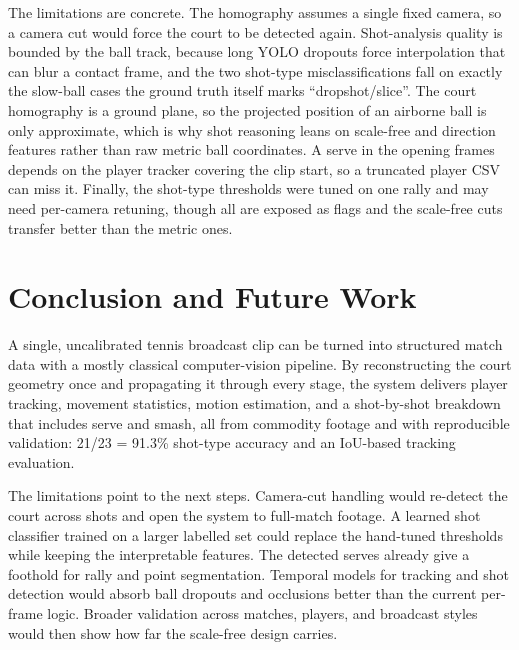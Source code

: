 \documentclass[11pt]{article}
\begin{document}
The limitations are concrete. The homography assumes a single fixed camera, so a camera cut would force the court to be detected again. Shot-analysis quality is bounded by the ball track, because long YOLO dropouts force interpolation that can blur a contact frame, and the two shot-type misclassifications fall on exactly the slow-ball cases the ground truth itself marks ``dropshot/slice''. The court homography is a ground plane, so the projected position of an airborne ball is only approximate, which is why shot reasoning leans on scale-free and direction features rather than raw metric ball coordinates. A serve in the opening frames depends on the player tracker covering the clip start, so a truncated player CSV can miss it. Finally, the shot-type thresholds were tuned on one rally and may need per-camera retuning, though all are exposed as flags and the scale-free cuts transfer better than the metric ones.

\section{Conclusion and Future Work}
A single, uncalibrated tennis broadcast clip can be turned into structured match data with a mostly classical computer-vision pipeline. By reconstructing the court geometry once and propagating it through every stage, the system delivers player tracking, movement statistics, motion estimation, and a shot-by-shot breakdown that includes serve and smash, all from commodity footage and with reproducible validation: 21/23 = 91.3\% shot-type accuracy and an IoU-based tracking evaluation.

The limitations point to the next steps. Camera-cut handling would re-detect the court across shots and open the system to full-match footage. A learned shot classifier trained on a larger labelled set could replace the hand-tuned thresholds while keeping the interpretable features. The detected serves already give a foothold for rally and point segmentation. Temporal models for tracking and shot detection would absorb ball dropouts and occlusions better than the current per-frame logic. Broader validation across matches, players, and broadcast styles would then show how far the scale-free design carries.
\end{document}
